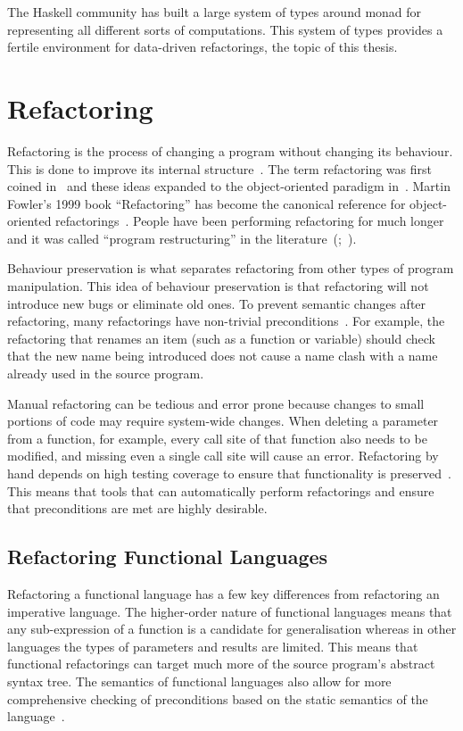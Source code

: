 The Haskell community has built a large system of types around monad for representing all different sorts of computations. This system of types provides a fertile environment for data-driven refactorings, the topic of this thesis.

\section{Refactoring} 
Refactoring is the process of changing a program without changing its behaviour. This is done to improve its internal structure~\citep{fowler}. The term refactoring was first coined in~\citep{programRestructuring} and these ideas expanded to the object-oriented paradigm in~\citep{refactOOFrameworks}. Martin Fowler's 1999 book ``Refactoring'' has become the canonical reference for object-oriented refactorings~\citep{fowler}. People have been performing refactoring for much longer and it was called ``program restructuring'' in the literature~(\cite{highSpeedRestructuring};~\cite{performanceRestructuring}). 

Behaviour preservation is what separates refactoring from other types of program manipulation. This idea of behaviour preservation is that refactoring will not introduce new bugs or eliminate old ones. To prevent semantic changes after refactoring, many refactorings have non-trivial preconditions~\citep{mens2002formalising}. For example, the refactoring that renames an item (such as a function or variable) should check that the new name being introduced does not cause a name clash with a name already used in the source program.

Manual refactoring can be tedious and error prone because changes to small portions of code may require system-wide changes. When deleting a parameter from a function, for example, every call site of that function also needs to be modified, and missing even a single call site will cause an error. Refactoring by hand depends on high testing coverage to ensure that functionality is preserved~\citep{fowler}. This means that tools that can automatically perform refactorings and ensure that preconditions are met are highly desirable.

\subsection{Refactoring Functional Languages}

Refactoring a functional language has a few key differences from refactoring an imperative language. The higher-order nature of functional languages means that any sub-expression of a function is a candidate for generalisation whereas in other languages the types of parameters and results are limited. This means that functional refactorings can target much more of the source program's abstract syntax tree. The semantics of functional languages also allow for more comprehensive checking of preconditions based on the static semantics of the language~\citep{refacTools}.

